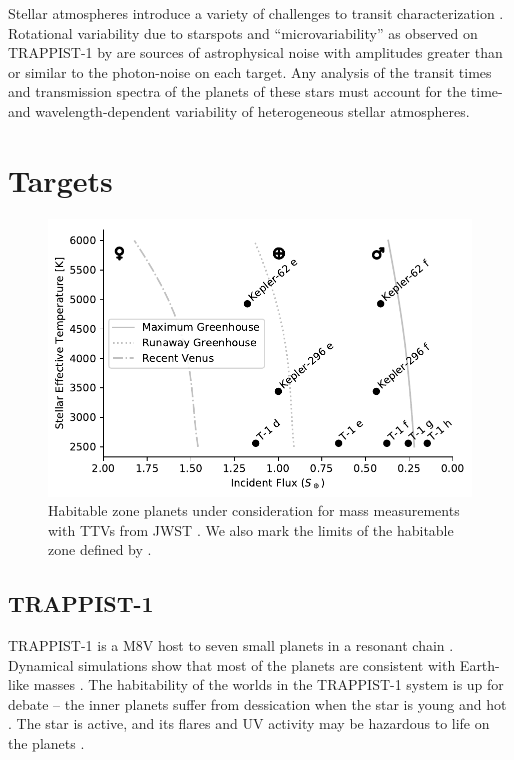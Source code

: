 Stellar atmospheres introduce a variety of challenges to transit characterization \citep{Rackham2018, Zhang2018}. Rotational variability due to starspots and  ``microvariability''  as observed on TRAPPIST-1 by \citet{Delrez2018} are sources of astrophysical noise with amplitudes greater than or similar to the photon-noise on each target. Any analysis of the transit times and transmission spectra of the planets of these stars must account for the time- and wavelength-dependent variability of heterogeneous stellar atmospheres.

\section{Targets}

\begin{figure}
\centering
\includegraphics[scale=0.58]{libra/census.pdf}
\caption{Habitable zone planets under consideration for mass measurements with TTVs from JWST \citep{Borucki2013, Delrez2018}. We also mark the limits of the habitable zone defined by \citet{Kopparapu2013}.}
\label{fig:census}
\end{figure}

\subsection{TRAPPIST-1}

TRAPPIST-1 is a M8V host to seven small planets in a resonant chain \citep{Gillon2016, Gillon2017, Luger2017, Delrez2018}. Dynamical simulations show that most of the planets are consistent with Earth-like masses \citep{Quarles2017}. The habitability of the worlds in the TRAPPIST-1 system is up for debate -- the inner planets suffer from dessication when the star is young and hot \citep{Luger2015, Bolmont2017}. The star is active, and its flares and UV activity may be hazardous to life on the planets \citep{Vida2017, Davenport2017, Roettenbacher2017}. 


